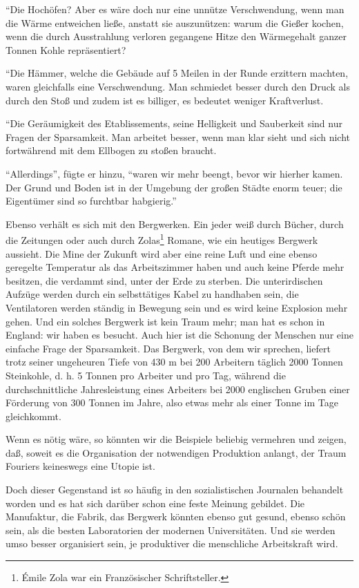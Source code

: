 \documentclass{scrbook}
\begin{document}
``Die Hochöfen? Aber es wäre doch nur eine unnütze Verschwendung, wenn man die Wärme entweichen ließe, anstatt sie auszunützen: warum die Gießer kochen, wenn die durch Ausstrahlung verloren gegangene Hitze den Wärmegehalt ganzer Tonnen Kohle repräsentiert?

``Die Hämmer, welche die Gebäude auf 5 Meilen in der Runde erzittern machten, waren gleichfalls eine Verschwendung. Man schmiedet besser durch den Druck als durch den Stoß und zudem ist es billiger, es bedeutet weniger Kraftverlust.

``Die Geräumigkeit des Etablissements, seine Helligkeit und Sauberkeit sind nur Fragen der Sparsamkeit. Man arbeitet besser, wenn man klar sieht und sich nicht fortwährend mit dem Ellbogen zu stoßen braucht.

``Allerdings'', fügte er hinzu, ``waren wir mehr beengt, bevor wir hierher kamen. Der Grund und Boden ist in der Umgebung der großen Städte enorm teuer; die Eigentümer sind so furchtbar habgierig.''

Ebenso verhält es sich mit den Bergwerken. Ein jeder weiß durch Bücher, durch die Zeitungen oder auch durch Zolas\footnote{Émile Zola war ein Französischer Schriftsteller.} Romane, wie ein heutiges Bergwerk aussieht. Die Mine der Zukunft wird aber eine reine Luft und eine ebenso geregelte Temperatur als das Arbeitszimmer haben und auch keine Pferde mehr besitzen, die verdammt sind, unter der Erde zu sterben. Die unterirdischen Aufzüge werden durch ein selbsttätiges Kabel zu handhaben sein, die Ventilatoren werden ständig in Bewegung sein und es wird keine Explosion mehr gehen. Und ein solches Bergwerk ist kein Traum mehr; man hat es schon in England: wir haben es besucht. Auch hier ist die Schonung der Menschen nur eine einfache Frage der Sparsamkeit. Das Bergwerk, von dem wir sprechen, liefert trotz seiner ungeheuren Tiefe von 430 m bei 200 Arbeitern täglich 2000 Tonnen Steinkohle, d. h. 5 Tonnen pro Arbeiter und pro Tag, während die durchschnittliche Jahresleistung eines Arbeiters bei 2000 englischen Gruben einer Förderung von 300 Tonnen im Jahre, also etwas mehr als einer Tonne im Tage gleichkommt.

Wenn es nötig wäre, so könnten wir die Beispiele beliebig vermehren und zeigen, daß, soweit es die Organisation der notwendigen Produktion anlangt, der Traum Fouriers keineswegs eine Utopie ist.

Doch dieser Gegenstand ist so häufig in den sozialistischen Journalen behandelt worden und es hat sich darüber schon eine feste Meinung gebildet. Die Manufaktur, die Fabrik, das Bergwerk könnten ebenso gut gesund, ebenso schön sein, als die besten Laboratorien der modernen Universitäten. Und sie werden umso besser organisiert sein, je produktiver die menschliche Arbeitskraft wird.
\end{document}
